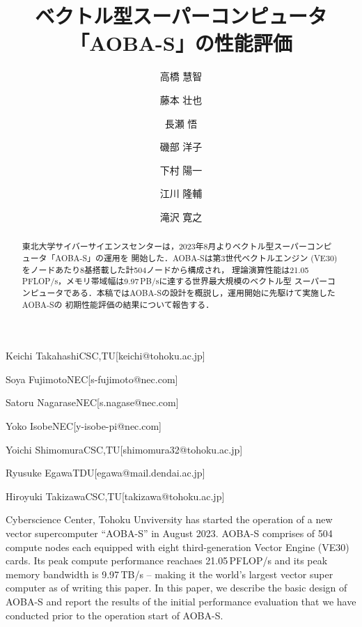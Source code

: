 ﻿\documentclass[submit,techrep,noauthor]{ipsj}
\begin{document}
\title{ベクトル型スーパーコンピュータ「AOBA-S」の性能評価}



\author{高橋 慧智}{Keichi Takahashi}{CSC,TU}[keichi@tohoku.ac.jp]
\author{藤本 壮也}{Soya Fujimoto}{NEC}[s-fujimoto@nec.com]
\author{長瀬 悟}{Satoru Nagarase}{NEC}[s.nagase@nec.com]
\author{磯部 洋子}{Yoko Isobe}{NEC}[y-isobe-pi@nec.com]
\author{下村 陽一}{Yoichi Shimomura}{CSC,TU}[shimomura32@tohoku.ac.jp]
\author{江川 隆輔}{Ryusuke Egawa}{TDU}[egawa@mail.dendai.ac.jp]
\author{滝沢 寛之}{Hiroyuki Takizawa}{CSC,TU}[takizawa@tohoku.ac.jp]

\begin{abstract}
東北大学サイバーサイエンスセンターは，2023年8月よりベクトル型スーパーコンピュータ「AOBA-S」の運用を
開始した．AOBA-Sは第3世代ベクトルエンジン (VE30) をノードあたり8基搭載した計504ノードから構成され，
理論演算性能は21.05\,PFLOP/s，メモリ帯域幅は9.97\,PB/sに達する世界最大規模のベクトル型
スーパーコンピュータである．本稿ではAOBA-Sの設計を概説し，運用開始に先駆けて実施したAOBA-Sの
初期性能評価の結果について報告する．
\end{abstract}

\begin{eabstract}
Cyberscience Center, Tohoku Unviversity has started the operation of a new vector supercomputer 
``AOBA-S'' in August 2023. AOBA-S comprises of 504 compute nodes each equipped with eight
third-generation Vector Engine (VE30) cards. Its peak compute performance reachaes 21.05\,PFLOP/s
and its peak memory bandwidth is 9.97\,TB/s -- making it the world's largest vector super computer as
of writing this paper. In this paper, we describe the basic design of AOBA-S and report the
results of the initial performance evaluation that we have conducted prior to the operation start of
AOBA-S.
\end{eabstract}

%
%
\end{document}
